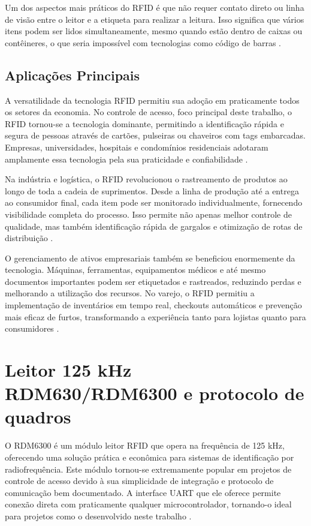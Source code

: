 Um dos aspectos mais práticos do RFID é que não requer contato direto ou linha de visão entre o leitor e a etiqueta para realizar a leitura. Isso significa que vários itens podem ser lidos simultaneamente, mesmo quando estão dentro de caixas ou contêineres, o que seria impossível com tecnologias como código de barras \cite{avery-dennison-rfid}.

\subsection{Aplicações Principais}

A versatilidade da tecnologia RFID permitiu sua adoção em praticamente todos os setores da economia. No controle de acesso, foco principal deste trabalho, o RFID tornou-se a tecnologia dominante, permitindo a identificação rápida e segura de pessoas através de cartões, pulseiras ou chaveiros com tags embarcadas. Empresas, universidades, hospitais e condomínios residenciais adotaram amplamente essa tecnologia pela sua praticidade e confiabilidade \cite{vieira-rfid-2007}.

Na indústria e logística, o RFID revolucionou o rastreamento de produtos ao longo de toda a cadeia de suprimentos. Desde a linha de produção até a entrega ao consumidor final, cada item pode ser monitorado individualmente, fornecendo visibilidade completa do processo. Isso permite não apenas melhor controle de qualidade, mas também identificação rápida de gargalos e otimização de rotas de distribuição \cite{avery-dennison-rfid}.

O gerenciamento de ativos empresariais também se beneficiou enormemente da tecnologia. Máquinas, ferramentas, equipamentos médicos e até mesmo documentos importantes podem ser etiquetados e rastreados, reduzindo perdas e melhorando a utilização dos recursos. No varejo, o RFID permitiu a implementação de inventários em tempo real, checkouts automáticos e prevenção mais eficaz de furtos, transformando a experiência tanto para lojistas quanto para consumidores \cite{vieira-rfid-2007}.

\section{Leitor 125 kHz RDM630/RDM6300 e protocolo de quadros}
\label{sec:leitor-rdm630}

O RDM6300 é um módulo leitor RFID que opera na frequência de 125 kHz, oferecendo uma solução prática e econômica para sistemas de identificação por radiofrequência. Este módulo tornou-se extremamente popular em projetos de controle de acesso devido à sua simplicidade de integração e protocolo de comunicação bem documentado. A interface UART que ele oferece permite conexão direta com praticamente qualquer microcontrolador, tornando-o ideal para projetos como o desenvolvido neste trabalho \cite{seeed-rfid-125khz}.

